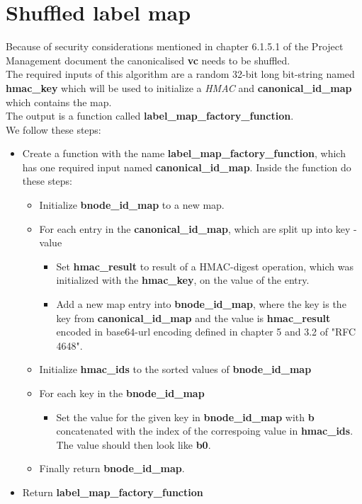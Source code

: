 \documentclass[
	a4paper               %
	,bibliography=totoc   %
	,listof=totoc         %
	,monolingual
]{bfhthesis}              %
\begin{document}
\section{Shuffled label map}
\label{sec:shuffledlabelmap}

Because of security considerations mentioned in chapter 6.1.5.1 of the Project Management document the canonicalised \textbf{vc} needs to be shuffled.\\

The required inputs of this algorithm are a random 32-bit long bit-string named \textbf{hmac\_key} which will be used to initialize a \textit{HMAC} and \textbf{canonical\_id\_map} which contains the map.\\

The output is a function called \textbf{label\_map\_factory\_function}.\\

We follow these steps:
\begin{itemize}
	\item Create a function with the name \textbf{label\_map\_factory\_function}, which has one required input named \textbf{canonical\_id\_map}. Inside the function do these steps:
	\begin{itemize}
		\item Initialize \textbf{bnode\_id\_map} to a new map.
		\item For each entry in the \textbf{canonical\_id\_map}, which are split up into key - value
		\begin{itemize}
			\item Set \textbf{hmac\_result} to result of a HMAC-digest operation, which was initialized with the \textbf{hmac\_key}, on the value of the entry. 
			\item Add a new map entry into \textbf{bnode\_id\_map}, where the key is the key from \textbf{canonical\_id\_map} and the value is \textbf{hmac\_result} encoded in base64-url encoding defined in chapter 5 and 3.2 of "RFC 4648"\cite{base64}.
		\end{itemize}
		\item Initialize \textbf{hmac\_ids} to the sorted values of \textbf{bnode\_id\_map}
		\item For each key in the \textbf{bnode\_id\_map}
		\begin{itemize}
			\item Set the value for the given key in \textbf{bnode\_id\_map} with \textbf{b} concatenated with the index of the correspoing value in \textbf{hmac\_ids}. The value should then look like \textbf{b0}.
		\end{itemize}
		\item Finally return \textbf{bnode\_id\_map}.
	\end{itemize}
	\item Return \textbf{label\_map\_factory\_function}
\end{itemize}
\end{document}
